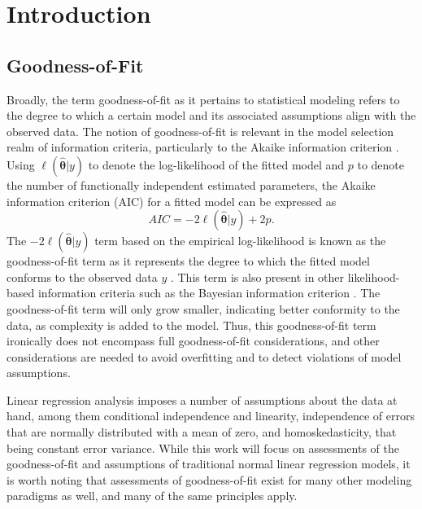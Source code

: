 \documentclass[submit]{smj}
\begin{document}

\maketitle


\section{Introduction}
	\subsection{Goodness-of-Fit}

    		Broadly, the term goodness-of-fit as it pertains to statistical modeling refers to the degree to which a certain model
		and its associated assumptions align with the observed data. The notion of goodness-of-fit is relevant in the model selection realm of information criteria, particularly to the Akaike
		information criterion \citep{Akaike}. Using $\ell(\hat{\bm{\theta}}|y)$ to denote the log-likelihood of the fitted model and $p$ to denote the
		number of functionally independent estimated parameters, the Akaike information criterion (AIC) for a fitted model can be expressed as
		\begin{equation*}
			AIC = -2 \ell(\hat{\bm{\theta}}|y) + 2 p.
		\end{equation*}
		The $-2 \ell(\hat{\bm{\theta}}|y)$ term based on the empirical log-likelihood is known as the goodness-of-fit term as it represents the degree to which the fitted model
		conforms to the observed data $y$ \citep{Cavanaugh}. This term is also present in other likelihood-based information criteria such as the Bayesian information criterion \citep{Schwarz}.
		The goodness-of-fit term will only grow smaller, indicating better conformity to the data, as complexity is added to the model. Thus, this goodness-of-fit term ironically does
		not encompass full goodness-of-fit considerations, and other considerations are needed to avoid overfitting and to detect violations of model assumptions.

		Linear regression analysis imposes a number of assumptions about the data at hand, among them conditional independence and linearity, independence of errors that are normally distributed with a mean of zero,
		and homoskedasticity, that being constant error variance. While this work will focus on assessments of the goodness-of-fit and assumptions of traditional normal linear regression models, it is worth noting
		that assessments of goodness-of-fit exist for many other modeling paradigms as well, and many of the same principles apply.
		
\end{document}
